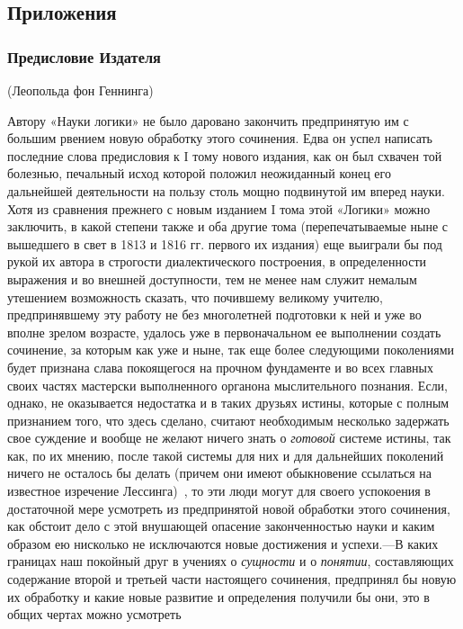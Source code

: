 \clearpage\subsection{Приложения}
\subsubsection{Предисловие Издателя}\label{bkm:Ref474669698}
{\centering
(Леопольда фон Геннинга)
\par}

Автору «Науки логики» не было даровано закончить предпринятую им с большим
рвением новую обработку этого сочинения. Едва он успел написать последние
слова предисловия к I тому нового издания, как он был схвачен той болезнью,
печальный исход которой положил неожиданный конец его дальнейшей
деятельности на пользу столь мощно подвинутой им вперед науки. Хотя из
сравнения прежнего с новым изданием I тома этой «Логики» можно заключить, в
какой степени также и оба другие тома (перепечатываемые ныне с вышедшего в
свет в 1813 и 1816 гг. первого их издания) еще выиграли бы под рукой их
автора в строгости диалектического построения, в определенности выражения и
во внешней доступности, тем не менее нам служит немалым утешением
возможность сказать, что почившему великому учителю, предпринявшему эту
работу не без многолетней подготовки к ней и уже во вполне зрелом возрасте,
удалось уже в первоначальном ее выполнении создать сочинение, за которым
как уже и ныне, так еще более следующими поколениями будет признана слава
покоящегося на прочном фундаменте и во всех главных своих частях мастерски
выполненного органона мыслительного познания. Если, однако, не оказывается
недостатка и в таких друзьях истины, которые с полным признанием того, что
здесь сделано, считают необходимым несколько задержать свое суждение и
вообще не желают ничего знать о {\em готовой} системе
истины, так как, по их мнению, после такой системы для них и для дальнейших
поколений ничего не осталось бы делать (причем они имеют обыкновение
ссылаться на известное изречение
Лессинга)~\label{bkm:Ref474655210},
то эти люди могут для своего успокоения в достаточной мере усмотреть из
предпринятой новой обработки этого сочинения, как обстоит дело с этой
внушающей опасение законченностью науки и каким образом ею нисколько не
исключаются новые достижения и успехи.—В каких границах наш покойный друг в
учениях о {\em сущности} и о
{\em понятии}, составляющих содержание второй и третьей
части настоящего сочинения, предпринял бы новую их обработку и какие новые
развитие и определения получили бы они, это в общих чертах можно усмотреть

